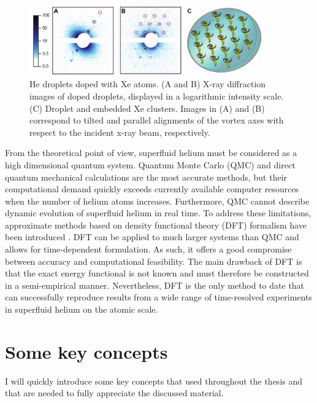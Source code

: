 \documentclass[11pt,a4paper,twoside]{article}
\begin{document}
		\begin{figure}[h]
			\begin{center}
				\includegraphics[width=0.9\textwidth]{vortex-array}
			\end{center}
			\caption{He droplets doped with Xe atoms. (A and B) X-ray diffraction images of doped droplets, displayed in a logarithmic intensity scale. (C) Droplet and embedded Xe clusters. Images in (A) and (B) correspond to tilted and parallel alignments of the vortex axes with respect to the incident x-ray beam, respectively.}
			\label{fig:vortex-array}
		\end{figure}
		
		From the theoretical point of view, superfluid helium must be considered as a high dimensional quantum system. Quantum Monte Carlo (QMC) \cite{Kro02} and direct quantum mechanical \cite{deL06,deL10,Agu13} calculations are the most accurate methods, but their computational demand quickly exceeds currently available computer resources when the number of helium atoms increases. Furthermore, QMC cannot describe dynamic evolution of superfluid helium in real time. To address these limitations, approximate methods based on  density functional theory (DFT) formalism have been introduced \cite{Str87a,Str87b,Dal95}. DFT can be applied to much larger systems than QMC and allows for time-dependent formulation. As such, it offers a good compromise between accuracy and computational feasibility. The main drawback of DFT is that the exact energy functional is not known and must therefore be constructed in a semi-empirical manner. Nevertheless, DFT is the only method to date that can successfully reproduce results from a wide range of time-resolved experiments in superfluid helium on the atomic scale.
	
	\section{Some key concepts}
	I will quickly introduce some key concepts that used throughout the thesis and that are needed to fully appreciate the discussed material. 
\end{document}
